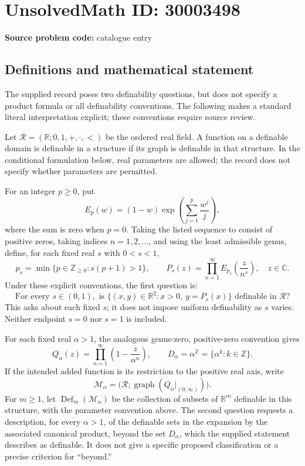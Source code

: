 \documentclass[11pt]{article}
\newcommand{\Z}{\mathbb{Z}}
\newcommand{\R}{\mathbb{R}}
\newcommand{\C}{\mathbb{C}}
\begin{document}
\section*{UnsolvedMath ID: 30003498}
\textbf{Source problem code:} catalogue entry
\subsection{Definitions and mathematical statement}
The supplied record poses two definability questions, but does not specify a product formula or all definability conventions. The following makes a standard literal interpretation explicit; these conventions require source review.

Let \(\mathcal R=(\R;0,1,+,\cdot,<)\) be the ordered real field. A function on a definable domain is definable in a structure if its graph is definable in that structure. In the conditional formulation below, real parameters are allowed; the record does not specify whether parameters are permitted.

For an integer \(p\geq 0\), put
\[
E_p(w)=(1-w)\exp\!\left(\sum_{j=1}^{p}\frac{w^j}{j}\right),
\]
where the sum is zero when \(p=0\). Taking the listed sequence to consist of positive zeros, taking indices \(n=1,2,\ldots\), and using the least admissible genus, define, for each fixed real \(s\) with \(0<s<1\),
\[
p_s=\min\{p\in\Z_{\geq0}:s(p+1)>1\},
\qquad
P_s(z)=\prod_{n=1}^{\infty}E_{p_s}\!\left(\frac{z}{n^s}\right),
\quad z\in\C.
\]
Under these explicit conventions, the first question is:
\[
\text{For every }s\in(0,1),\text{ is }
\{(x,y)\in\R^2:x>0,\ y=P_s(x)\}
\text{ definable in }\mathcal R\text{?}
\]
This asks about each fixed \(s\); it does not impose uniform definability as \(s\) varies. Neither endpoint \(s=0\) nor \(s=1\) is included.

For each fixed real \(\alpha>1\), the analogous genus-zero, positive-zero convention gives
\[
Q_\alpha(z)=\prod_{n=1}^{\infty}\left(1-\frac{z}{\alpha^n}\right),
\qquad
D_\alpha=\alpha^{\Z}=\{\alpha^k:k\in\Z\}.
\]
If the intended added function is its restriction to the positive real axis, write
\[
\mathcal M_\alpha=
\bigl(\mathcal R;\operatorname{graph}(Q_\alpha|_{(0,\infty)})\bigr).
\]
For \(m\geq1\), let \(\operatorname{Def}_m(\mathcal M_\alpha)\) be the collection of subsets of \(\R^m\) definable in this structure, with the parameter convention above. The second question requests a description, for every \(\alpha>1\), of the definable sets in the expansion by the associated canonical product, beyond the set \(D_\alpha\), which the supplied statement describes as definable. It does not give a specific proposed classification or a precise criterion for ``beyond.''
\end{document}
